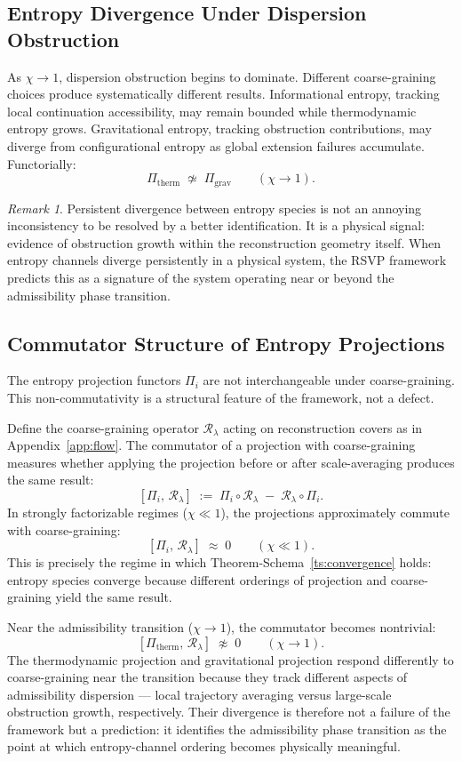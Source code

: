 \documentclass[11pt, a4paper]{article}
\theoremstyle{plain}
\theoremstyle{definition}
\theoremstyle{remark}
\newtheorem{remark}[theorem]{Remark}
\newcommand{\Rcoarse}{\mathcal{R}_\lambda}
\newcommand{\Pitherm}{\Pi_{\mathrm{therm}}}
\newcommand{\Pigrav}{\Pi_{\mathrm{grav}}}
\begin{document}
\subsection{Entropy Divergence Under Dispersion Obstruction}

As $\chi \to 1$, dispersion obstruction begins to dominate. Different coarse-graining
choices produce systematically different results. Informational entropy, tracking
local continuation accessibility, may remain bounded while thermodynamic entropy
grows. Gravitational entropy, tracking obstruction contributions, may diverge from
configurational entropy as global extension failures accumulate. Functorially:
\[
  \Pitherm \;\not\simeq\; \Pigrav
  \qquad (\chi \to 1).
\]

\begin{remark}
Persistent divergence between entropy species is not an annoying inconsistency to be
resolved by a better identification. It is a physical signal: evidence of obstruction
growth within the reconstruction geometry itself. When entropy channels diverge
persistently in a physical system, the RSVP framework predicts this as a signature
of the system operating near or beyond the admissibility phase transition.
\end{remark}

\subsection{Commutator Structure of Entropy Projections}
\label{sec:commutator}

The entropy projection functors $\Pi_i$ are not interchangeable under coarse-graining.
This non-commutativity is a structural feature of the framework, not a defect.

Define the coarse-graining operator $\Rcoarse$ acting on reconstruction covers as in
Appendix~\ref{app:flow}. The commutator of a projection with coarse-graining measures
whether applying the projection before or after scale-averaging produces the same
result:
\[
  [\Pi_i,\, \Rcoarse] \;:=\; \Pi_i \circ \Rcoarse \;-\; \Rcoarse \circ \Pi_i.
\]
In strongly factorizable regimes ($\chi \ll 1$), the projections approximately commute
with coarse-graining:
\[
  [\Pi_i,\, \Rcoarse] \;\approx\; 0 \qquad (\chi \ll 1).
\]
This is precisely the regime in which Theorem-Schema~\ref{ts:convergence} holds:
entropy species converge because different orderings of projection and coarse-graining
yield the same result.

Near the admissibility transition ($\chi \to 1$), the commutator becomes nontrivial:
\[
  [\Pi_{\mathrm{therm}},\, \Rcoarse] \;\not\approx\; 0 \qquad (\chi \to 1).
\]
The thermodynamic projection and gravitational projection respond differently to
coarse-graining near the transition because they track different aspects of
admissibility dispersion --- local trajectory averaging versus large-scale obstruction
growth, respectively. Their divergence is therefore not a failure of the framework
but a prediction: it identifies the admissibility phase transition as the point at
which entropy-channel ordering becomes physically meaningful.
\end{document}
